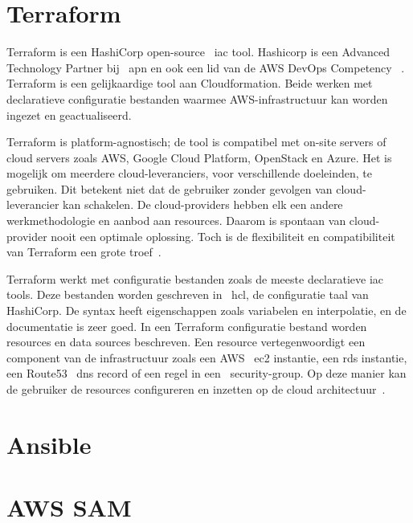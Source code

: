 \section{Terraform}
\label{subsec:service-terraform}

Terraform is een HashiCorp open-source ~\acrfull{iac} tool.
Hashicorp is een Advanced Technology Partner bij ~\acrfull{apn} en ook een lid van de AWS DevOps Competency ~\autocite{Campbell2018}.
Terraform is een gelijkaardige tool aan Cloudformation.
Beide werken met declaratieve configuratie bestanden waarmee AWS-infrastructuur kan worden ingezet en geactualiseerd.

Terraform is platform-agnostisch;
de tool is compatibel met on-site servers of cloud servers zoals AWS, Google Cloud Platform, OpenStack en Azure.
Het is mogelijk om meerdere cloud-leveranciers, voor verschillende doeleinden, te gebruiken.
Dit betekent niet dat de gebruiker zonder gevolgen van cloud-leverancier kan schakelen.
De cloud-providers hebben elk een andere werkmethodologie en aanbod aan resources.
Daarom is spontaan van cloud-provider nooit een optimale oplossing.
Toch is de flexibiliteit en compatibiliteit van Terraform een grote troef~\autocite{Szalski2019}.

Terraform werkt met configuratie bestanden zoals de meeste declaratieve \acrshort{iac} tools.
Deze bestanden worden geschreven in ~\acrfull{hcl}, de configuratie taal van HashiCorp.
De syntax heeft eigenschappen zoals variabelen en interpolatie, en de documentatie is zeer goed.
In een Terraform configuratie bestand worden resources en data sources beschreven.
Een resource vertegenwoordigt een component van de infrastructuur zoals een AWS ~\acrshort{ec2} instantie, een \acrshort{rds} instantie, een Route53 ~\acrshort{dns} record of een regel in een ~\gls{security-group}.
Op deze manier kan de gebruiker de resources configureren en inzetten op de cloud architectuur~\autocite{Szalski2019}.

\section{Ansible}
\label{subsec:service-ansible}


\section{AWS SAM}
\label{subsec:service-sam}


